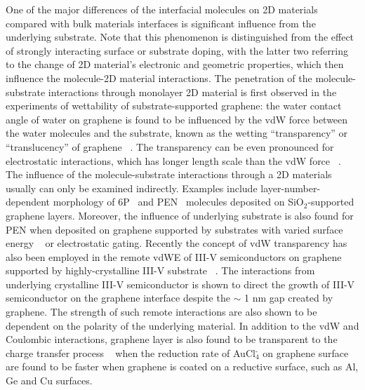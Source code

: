 One of the major differences of the interfacial molecules on 2D
materials compared with bulk materials interfaces is significant
influence from the underlying substrate. Note that this phenomenon is
distinguished from the effect of strongly interacting surface or
substrate doping, with the latter two referring to the change of 2D
material's electronic and geometric properties, which then influence
the molecule-2D material interactions. The penetration of the
molecule-substrate interactions through monolayer 2D material is first
observed in the experiments of wettability of substrate-supported
graphene: the water contact angle of water on graphene is found to be
influenced by the vdW force between the water molecules and the
substrate, known as the wetting ``transparency'' or ``translucency''
of graphene
~\cite{rafiee_wetting_2012,shih_breakdown_2012,shih_wetting_2013}. The
transparency can be even pronounced for electrostatic interactions,
which has longer length scale than the vdW force
~\cite{Shih_2015_PartiallyScreened,Tian_2016_multiscale}.  The
influence of the molecule-substrate interactions through a 2D
materials usually can only be examined indirectly.
%
Examples include layer-number-dependent morphology of
6P~\cite{Kratzer_2014_6P_gr_layer} and
PEN~\cite{Chhikara_2014_gr_pent_trans} molecules deposited on
SiO\(_{\text{2}}\)-supported graphene layers. Moreover, the influence
of underlying substrate is also found for PEN when deposited on
graphene supported by substrates with varied surface energy ~\cite{Nguyen_2015_pent_gr_wett} or
electrostatic gating. 
%
Recently the concept of vdW transparency has also been
employed in the remote vdWE of III-V semiconductors on graphene supported by highly-crystalline III-V substrate
~\cite{Kim_2017_remote_epi_Gr}. 
%
The interactions from underlying crystalline III-V semiconductor is
shown to direct the growth of III-V semiconductor on the graphene
interface despite the $\sim{}$ 1 nm gap created by graphene. The
strength of such remote interactions are also shown to be dependent on
the polarity of the underlying material. 
%
In addition to the vdW and Coulombic interactions,
graphene layer is also found to be transparent to the charge transfer
process ~\cite{Jeong_2015_DA_transparency_gr} when the reduction rate of
AuCl\(_{\text{4}}^{\text{-}}\) on graphene surface are found to be
faster when graphene is coated on a reductive surface, such as Al, Ge
and Cu surfaces. 


